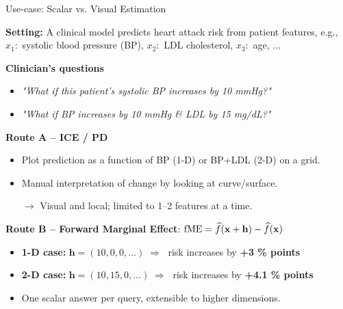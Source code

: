 \documentclass[10pt,compress,t,notes=noshow, xcolor=table]{beamer}
\begin{document}
\begin{frame}{Use-case: Scalar vs. Visual Estimation}

\textbf{Setting:}  
A clinical model predicts heart attack risk from patient features, e.g., $x_1:$ systolic blood pressure (BP), $x_2:$ LDL cholesterol, $x_3:$ age, ...

\vspace{0.5em}
\textbf{Clinician’s questions}
\begin{itemize}\setlength\itemsep{0.3em}
  \item \emph{"What if this patient’s systolic BP increases by 10 mmHg?"}
  \item \emph{"What if BP increases by 10 mmHg \& LDL by 15 mg/dL?"}
\end{itemize}

\vspace{0.5em}
\textbf{Route A – ICE / PD}
\begin{itemize}
  \item Plot prediction as a function of BP (1-D) or BP+LDL (2-D) on a grid.
  \item Manual interpretation of change by looking at curve/surface.
  \item[\(\rightarrow\)] Visual and local; limited to 1–2 features at a time.
\end{itemize}

\vspace{0.3em}
\textbf{Route B – Forward Marginal Effect}: $\mathrm{fME}
  = \widehat f(\mathbf{x} + \mathbf{h}) - \widehat f(\mathbf{x})$
\begin{itemize}
  \item \textbf{1-D case:} \(\mathbf{h} = (10, 0, 0, \dots) \;\Rightarrow\;\) risk increases by \textbf{+3 \% points}
  \item \textbf{2-D case:} \(\mathbf{h} = (10, 15, 0, \dots) \;\Rightarrow\;\) risk increases by \textbf{+4.1 \% points}
  \item One scalar answer per query, extensible to higher dimensions.
\end{itemize}

\end{frame}

\end{document}
